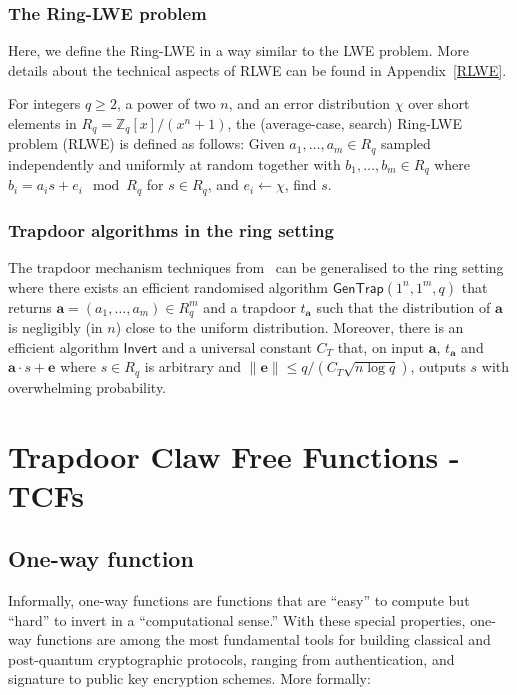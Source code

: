 \documentclass[cryptography,review,submit,pdftex,moreauthors,amsmath,amssymb,aps,strict]{Definitions/mdpi}
\newcommand{\minh}[1]{\textcolor{blue}{#1}}
\begin{document}

\subsubsection{The Ring-LWE problem}
Here, we define the Ring-LWE in a way similar to the LWE problem. More details about the technical aspects of RLWE can be found in Appendix~\ref{RLWE}.

For integers $q\geq 2$, a power of two $n$, and an error distribution $\chi$ over short elements in $R_q = \mathbb{Z}_q[x]/(x^n+1)$, the (average-case, search) Ring-LWE problem (RLWE) is defined as follows: 
Given $a_1,\dots, a_{m}\in R_q$ sampled independently and uniformly at random together with $b_1,\dots,b_{m}\in R_q$ where $b_i=a_i s + e_i \mod R_q$ for $s\in R_q$, and $e_i\gets \chi$, find $s$.


\subsubsection{Trapdoor algorithms in the ring setting}

The trapdoor mechanism techniques from~\cite{MP12} can be generalised to the ring setting where there exists an efficient randomised algorithm $\mathsf{GenTrap}(1^n,1^m,q)$ that returns $\mathbf{a}=(a_1,\dots,a_m)\in R^{m}_q$ and a trapdoor $t_{\mathbf{a}}$ such that the distribution of $\mathbf{a}$ is negligibly (in $n$) close to the uniform distribution. Moreover, there is an efficient algorithm $\mathsf{Invert}$ and a universal constant $C_T$ that, on input $\mathbf{a}$, $t_{\mathbf{a}}$ and $\mathbf{a}\cdot s+\mathbf{e}$ where $s \in R_q$ is arbitrary and $\|\mathbf{e}\|\leq q/(C_T\sqrt{n\log q})$, outputs $s$ with overwhelming probability.

\section{Trapdoor Claw Free Functions - TCFs} \label{tfcs}

\subsection{One-way function}
Informally, one-way functions are functions that are ``easy'' to compute but ``hard'' to invert in a ``computational sense.'' With these special properties, one-way functions are among the most fundamental tools for building classical and post-quantum cryptographic protocols, ranging from authentication, and signature to public key encryption schemes. More formally:
\end{document}
